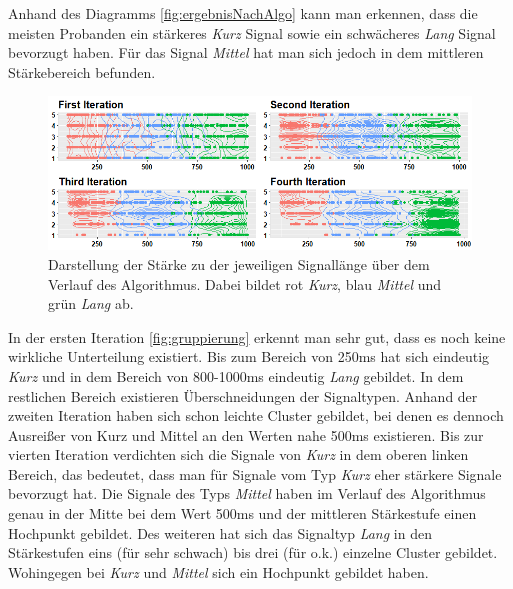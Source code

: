 Anhand des Diagramms \autoref{fig:ergebnisNachAlgo} kann man erkennen, dass die meisten Probanden ein st{\"a}rkeres \textit{Kurz} Signal sowie ein schw{\"a}cheres \textit{Lang} Signal bevorzugt haben. F{\"u}r das Signal \textit{Mittel} hat man sich jedoch in dem mittleren St{\"a}rkebereich befunden.

\begin{figure}[htbp] 
            \centering
   	\includegraphics[width=\textwidth]{pics/analyse/algo/gruppierung.png}
	\caption{Darstellung der St{\"a}rke zu der jeweiligen Signall{\"a}nge {\"u}ber dem Verlauf des Algorithmus. Dabei bildet rot \textit{Kurz}, blau \textit{Mittel} und gr{\"u}n \textit{Lang} ab.}
	\label{fig:gruppierung}
\end{figure}

In der ersten Iteration \autoref{fig:gruppierung} erkennt man sehr gut, dass es noch keine wirkliche Unterteilung existiert.
Bis zum Bereich von 250ms hat sich eindeutig \textit{Kurz} und in dem Bereich von 800-1000ms eindeutig \textit{Lang} gebildet. In dem restlichen Bereich existieren {\"U}berschneidungen der Signaltypen.
Anhand der zweiten Iteration haben sich schon leichte Cluster gebildet, bei denen es dennoch Ausrei{\ss}er von Kurz und Mittel an den Werten nahe 500ms existieren. 
Bis zur vierten Iteration verdichten sich die Signale von \textit{Kurz} in dem oberen linken Bereich, das bedeutet, dass man f{\"u}r Signale vom Typ \textit{Kurz} eher st{\"a}rkere Signale bevorzugt hat. 
Die Signale des Typs \textit{Mittel} haben im Verlauf des Algorithmus genau in der Mitte bei dem Wert 500ms und der mittleren St{\"a}rkestufe einen Hochpunkt gebildet. 
Des weiteren hat sich das Signaltyp \textit{Lang} in den St{\"a}rkestufen eins (f{\"u}r sehr schwach) bis drei (f{\"u}r o.k.) einzelne Cluster gebildet. 
Wohingegen bei \textit{Kurz} und \textit{Mittel} sich ein Hochpunkt gebildet haben.

